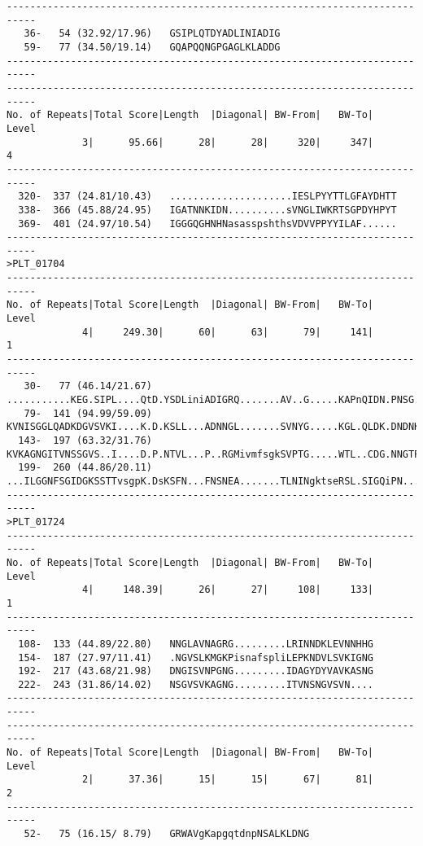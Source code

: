 \begin{verbatim}
---------------------------------------------------------------------------
   36-   54 (32.92/17.96)	GSIPLQTDYADLINIADIG
   59-   77 (34.50/19.14)	GQAPQQNGPGAGLKLADDG
---------------------------------------------------------------------------
---------------------------------------------------------------------------
No. of Repeats|Total Score|Length  |Diagonal| BW-From|   BW-To|   Level
             3|      95.66|      28|      28|     320|     347|       4
---------------------------------------------------------------------------
  320-  337 (24.81/10.43)	.....................IESLPYYTTLGFAYDHTT
  338-  366 (45.88/24.95)	IGATNNKIDN..........sVNGLIWKRTSGPDYHPYT
  369-  401 (24.97/10.54)	IGGGQGHNHNasasspshthsVDVVPPYYILAF......
---------------------------------------------------------------------------
>PLT_01704
---------------------------------------------------------------------------
No. of Repeats|Total Score|Length  |Diagonal| BW-From|   BW-To|   Level
             4|     249.30|      60|      63|      79|     141|       1
---------------------------------------------------------------------------
   30-   77 (46.14/21.67)	...........KEG.SIPL....QtD.YSDLiniADIGRQ.......AV..G.....KAPnQIDN.PNSG.LVLNND.SGL.....A
   79-  141 (94.99/59.09)	KVNISGGLQADKDGVSVKI....K.D.KSLL...ADNNGL.......SVNYG.....KGL.QLDK.DNDNKLTINSH.DGIEIvagG
  143-  197 (63.32/31.76)	KVKAGNGITVNSSGVS..I....D.P.NTVL...P..RGMivmfsgkSVPTG.....WTL..CDG.NNGTPNLIDR...........
  199-  260 (44.86/20.11)	...ILGGNFSGIDGKSSTTvsgpK.DsKSFN...FNSNEA.......TLNINgktseRSL.SIGQiPN......HSHlSGINI....
---------------------------------------------------------------------------
>PLT_01724
---------------------------------------------------------------------------
No. of Repeats|Total Score|Length  |Diagonal| BW-From|   BW-To|   Level
             4|     148.39|      26|      27|     108|     133|       1
---------------------------------------------------------------------------
  108-  133 (44.89/22.80)	NNGLAVNAGRG.........LRINNDKLEVNNHHG
  154-  187 (27.97/11.41)	.NGVSLKMGKPisnafspliLEPKNDVLSVKIGNG
  192-  217 (43.68/21.98)	DNGISVNPGNG.........IDAGYDYVAVKASNG
  222-  243 (31.86/14.02)	NSGVSVKAGNG.........ITVNSNGVSVN....
---------------------------------------------------------------------------
---------------------------------------------------------------------------
No. of Repeats|Total Score|Length  |Diagonal| BW-From|   BW-To|   Level
             2|      37.36|      15|      15|      67|      81|       2
---------------------------------------------------------------------------
   52-   75 (16.15/ 8.79)	GRWAVgKapgqtdnpNSALKLDNG

\end{verbatim}
